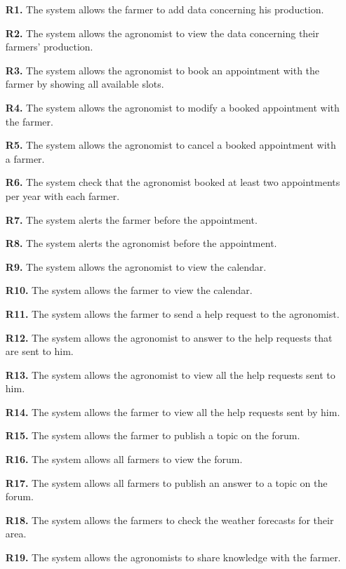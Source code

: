 \begin{enumerate}
	\item [\textbf{R1.}] The system allows the farmer to add data concerning his production.
	\item [\textbf{R2.}] The system allows the agronomist to view the data concerning their farmers' production.
	\item [\textbf{R3.}] The system allows the agronomist to book an appointment with the farmer by showing all available slots.
	\item [\textbf{R4.}] The system allows the agronomist to modify a booked appointment with the farmer.
	\item [\textbf{R5.}] The system allows the agronomist to cancel a booked appointment with a farmer.
	\item [\textbf{R6.}] The system check that the agronomist booked at least two appointments per year with each farmer.
	\item [\textbf{R7.}] The system alerts the farmer before the appointment.
	\item [\textbf{R8.}] The system alerts the agronomist before the appointment.
	\item [\textbf{R9.}] The system allows the agronomist to view the calendar.
	\item [\textbf{R10.}] The system allows the farmer to view the calendar.
	\item [\textbf{R11.}] The system allows the farmer to send a help request to the agronomist.
	\item [\textbf{R12.}] The system allows the agronomist to answer to the help requests that are sent to him.
	\item [\textbf{R13.}] The system allows the agronomist to view all the help requests sent to him.
	\item [\textbf{R14.}] The system allows the farmer to view all the help requests sent by him.
	\item [\textbf{R15.}] The system allows the farmer to publish a topic on the forum.
	\item [\textbf{R16.}] The system allows all farmers to view the forum.
	\item [\textbf{R17.}] The system allows all farmers to publish an answer to a topic on the forum.
	\item [\textbf{R18.}] The system allows the farmers to check the weather forecasts for their area.
	\item [\textbf{R19.}] The system allows the agronomists to share knowledge with the farmer.

\end{enumerate}
